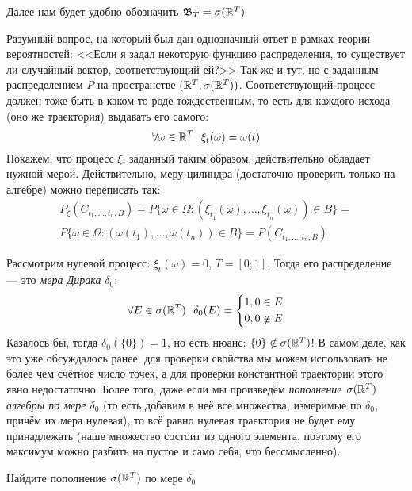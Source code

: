 \begin{note}
	Далее нам будет удобно обозначить $\mathfrak{B}_T = \sigma(\mathbb{R}^T)$
\end{note}

\begin{note}
	Разумный вопрос, на который был дан однозначный ответ в рамках теории вероятностей: <<Если я задал некоторую функцию распределения, то существует ли случайный вектор, соответствующий ей?>> Так же и тут, но с заданным распределением $P$ на пространстве $(\mathbb{R}^T, \sigma(\mathbb{R}^T))$. Соответствующий процесс должен тоже быть в каком-то роде тождественным, то есть для каждого исхода (оно же траектория) выдавать его самого:
	\[
	\forall \omega \in \mathbb{R}^T\ \ \xi_t(\omega) = \omega(t)
	\]
	Покажем, что процесс $\xi$, заданный таким образом, действительно обладает нужной мерой. Действительно, меру цилиндра (достаточно проверить только на алгебре) можно переписать так:
	\begin{multline*}
		P_\xi(C_{t_1, \ldots, t_n, B}) = P\{\omega \in \Omega \colon (\xi_{t_1}(\omega), \ldots, \xi_{t_n}(\omega)) \in B\} =
		\\
		P\{\omega \in \Omega \colon (\omega(t_1), \ldots, \omega(t_n)) \in B\} = P(C_{t_1, \ldots, t_n, B})
	\end{multline*}
\end{note}

\begin{example}
	Рассмотрим нулевой процесс: $\xi_t(\omega) = 0$, $T = [0; 1]$. Тогда его распределение --- это \textit{мера Дирака} $\delta_0$:
	\[
	\forall E \in \sigma(\mathbb{R}^T)\ \ \delta_0(E) = \left\{\begin{aligned}
		&{1, 0 \in E}
		\\
		&{0, 0 \notin E}
	\end{aligned}\right.
	\]
	Казалось бы, тогда $\delta_0(\{0\}) = 1$, но есть нюанс: $\{0\} \notin \sigma(\mathbb{R}^T)$! В самом деле, как это уже обсуждалось ранее, для проверки свойства мы можем использовать не более чем счётное число точек, а для проверки константной траектории этого явно недостаточно. Более того, даже если мы произведём \textit{пополнение $\sigma(\mathbb{R}^T)$ алгебры по мере $\delta_0$} (то есть добавим в неё все множества, измеримые по $\delta_0$, причём их мера нулевая), то всё равно нулевая траектория не будет ему принадлежать (наше множество состоит из одного элемента, поэтому его максимум можно разбить на пустое и само себя, что бессмысленно).
\end{example}

\begin{exercise}
	Найдите пополнение $\sigma(\mathbb{R}^T)$ по мере $\delta_0$
\end{exercise}

